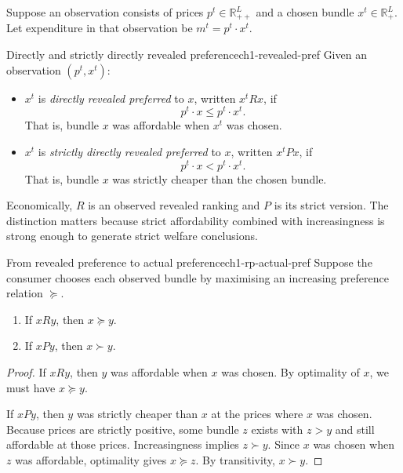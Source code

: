 Suppose an observation consists of prices $p^t \in \mathbb{R}^L_{++}$ and a chosen bundle $x^t \in \mathbb{R}^L_+$. Let expenditure in that observation be $m^t = p^t \cdot x^t$.

\begin{definition}{Directly and strictly directly revealed preference}{ch1-revealed-pref}
Given an observation $(p^t,x^t)$:
\begin{itemize}
    \item $x^t$ is \emph{directly revealed preferred} to $x$, written $x^t R x$, if
    \[
    p^t \cdot x \le p^t \cdot x^t.
    \]
    That is, bundle $x$ was affordable when $x^t$ was chosen.
    \item $x^t$ is \emph{strictly directly revealed preferred} to $x$, written $x^t P x$, if
    \[
    p^t \cdot x < p^t \cdot x^t.
    \]
    That is, bundle $x$ was strictly cheaper than the chosen bundle.
\end{itemize}
\end{definition}

Economically, $R$ is an observed revealed ranking and $P$ is its strict version. The distinction matters because strict affordability combined with increasingness is strong enough to generate strict welfare conclusions.

\begin{theorem}{From revealed preference to actual preference}{ch1-rp-actual-pref}
Suppose the consumer chooses each observed bundle by maximising an increasing preference relation $\succeq$.
\begin{enumerate}
    \item If $x R y$, then $x \succeq y$.
    \item If $x P y$, then $x \succ y$.
\end{enumerate}
\end{theorem}

\begin{proof}
If $x R y$, then $y$ was affordable when $x$ was chosen. By optimality of $x$, we must have $x \succeq y$.

If $x P y$, then $y$ was strictly cheaper than $x$ at the prices where $x$ was chosen. Because prices are strictly positive, some bundle $z$ exists with $z > y$ and still affordable at those prices. Increasingness implies $z \succ y$. Since $x$ was chosen when $z$ was affordable, optimality gives $x \succeq z$. By transitivity, $x \succ y$.
\end{proof}

